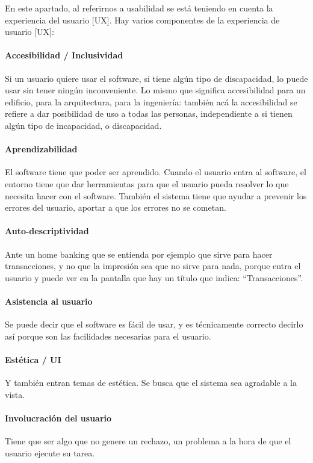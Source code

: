 En este apartado, al referirnos a usabilidad se está teniendo en cuenta
la experiencia del usuario {[}UX{]}. Hay varios componentes de la
experiencia de usuario {[}UX{]}:

\hypertarget{accesibilidad}{%
\paragraph{Accesibilidad / Inclusividad}\label{accesibilidad}}
Si un usuario quiere usar el software, si tiene
  algún tipo de discapacidad, lo puede usar sin tener ningún
  inconveniente. Lo mismo que significa accesibilidad para un edificio,
  para la arquitectura, para la ingeniería: también acá la accesibilidad
  se refiere a dar posibilidad de uso a todas las personas,
  independiente a si tienen algún tipo de incapacidad, o discapacidad.
\hypertarget{aprendizabilidad}{%
\paragraph{Aprendizabilidad}\label{aprendizabilidad}}
 El software tiene que poder ser aprendido.
  Cuando el usuario entra al software, el entorno tiene que dar
  herramientas para que el usuario pueda resolver lo que necesita hacer
  con el software.
  También el sistema tiene que ayudar a prevenir los
  errores del usuario, aportar a que los errores no se cometan.
\paragraph{Auto-descriptividad}
  Ante un home banking que se
  entienda por ejemplo que sirve para hacer transacciones, y no que la
  impresión sea que no sirve para nada, porque entra el usuario y puede
  ver en la pantalla que hay un título que indica: ``Transacciones''.
\paragraph{Asistencia al usuario}
  Se puede decir que el software es fácil de usar, y es técnicamente
  correcto decirlo así porque son las facilidades necesarias para el
  usuario.
\hypertarget{estetica}{%
\paragraph{Estética / UI}\label{estetica}}
  Y también entran temas de estética. Se busca que el sistema sea agradable a la vista.
\paragraph{Involucración del usuario}
  Tiene que ser algo que no genere un rechazo, un
  problema a la hora de que el usuario ejecute su tarea.
